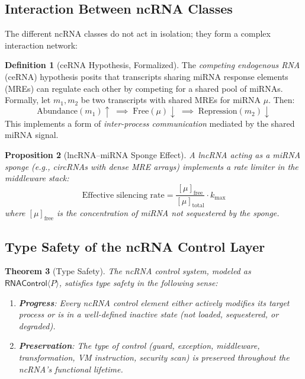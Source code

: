 \documentclass[12pt,a4paper]{article}
\newtheorem{theorem}{Theorem}[section]
\newtheorem{proposition}[theorem]{Proposition}
\theoremstyle{definition}
\newtheorem{definition}[theorem]{Definition}
\newcommand{\RNAType}{\mathsf{RNAControl}}
\begin{document}
\subsection{Interaction Between ncRNA Classes}

The different ncRNA classes do not act in isolation; they form a
complex interaction network:

\begin{definition}[ceRNA Hypothesis, Formalized]
The \emph{competing endogenous RNA} (ceRNA) hypothesis posits that
transcripts sharing miRNA response elements (MREs) can regulate each
other by competing for a shared pool of miRNAs.  Formally, let
$m_1, m_2$ be two transcripts with shared MREs for miRNA $\mu$.
Then:
\[
  \text{Abundance}(m_1) \uparrow \;\implies\;
  \text{Free}(\mu) \downarrow \;\implies\;
  \text{Repression}(m_2) \downarrow
\]
This implements a form of \emph{inter-process communication} mediated
by the shared miRNA signal.
\end{definition}

\begin{proposition}[lncRNA--miRNA Sponge Effect]
A lncRNA acting as a miRNA sponge (e.g., circRNAs with dense MRE
arrays) implements a \emph{rate limiter} in the middleware stack:
\[
  \text{Effective silencing rate} =
  \frac{[\mu]_{\text{free}}}{[\mu]_{\text{total}}} \cdot k_{\text{max}}
\]
where $[\mu]_{\text{free}}$ is the concentration of miRNA not
sequestered by the sponge.
\end{proposition}

\subsection{Type Safety of the ncRNA Control Layer}

\begin{theorem}[Type Safety]\label{thm:type-safety}
The ncRNA control system, modeled as $\RNAType\langle P\rangle$,
satisfies type safety in the following sense:
\begin{enumerate}[label=(\roman*)]
  \item \textbf{Progress}: Every ncRNA control element either actively
    modifies its target process or is in a well-defined inactive state
    (not loaded, sequestered, or degraded).
  \item \textbf{Preservation}: The type of control (guard, exception,
    middleware, transformation, VM instruction, security scan) is
    preserved throughout the ncRNA's functional lifetime.
\end{enumerate}
\end{theorem}
\end{document}
